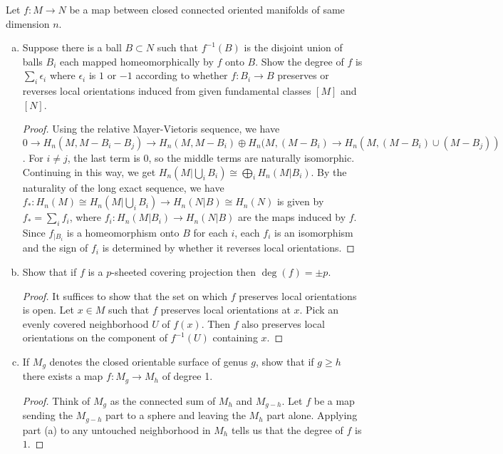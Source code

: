 \documentclass{article}
\begin{document}
 Let $f : M \to N$ be a map between closed connected oriented manifolds of same dimension $n$.
\begin{enumerate}[a.]
\item Suppose there is a ball $B \subset N$ such that $f^{-1}(B)$ is the disjoint union of balls $B_i$ each 
mapped homeomorphically by $f$ onto $B$. Show the degree of $f$ is $\sum_i \epsilon_i$ where $\epsilon_i$
is $1$ or $-1$ according to whether $f:B_i \to B$ preserves or reverses local orientations induced from
given fundamental classes $[M]$ and $[N]$.
\begin{proof} 
Using the relative Mayer-Vietoris sequence, we have 
$$0 \to H_n(M, M- B_i -B_j) \to H_n(M, M- B_i) \oplus H_n(M, (M- B_i) \to H_n(M, (M- B_i) \cup (M - B_j))$$.
For $i \neq j$, the last term is $0$, so the middle terms are naturally isomorphic. Continuing in this way, we get
$H_n(M | \bigcup_i B_i) \cong \bigoplus_i H_n(M | B_i)$. By the naturality of the long exact sequence,
 we have $f_*:H_n(M) \cong H_n(M | \bigcup_i B_i) \to H_n( N | B) \cong H_n(N)$ is given by
$f_* = \sum_i f_i$, where $f_i: H_n(M|B_i) \to H_n(N|B)$ are the maps induced by $f$.  Since $f_{|B_i}$ is
a homeomorphism onto $B$ for each $i$, each $f_i$ is an isomorphism and the sign of $f_i$ is determined 
by whether it reverses local orientations.  
\end{proof}
\item Show that if $f$ is a $p$-sheeted covering projection then $\deg(f) = \pm p$.
\begin{proof}
It suffices to show that the set on which $f$ preserves local orientations is open. Let $x \in M$
such that $f$ preserves local orientations at $x$. Pick an evenly covered neighborhood $U$ of $f(x)$.  
Then $f$ also preserves local orientations on the component of $f^{-1}(U)$ containing $x$.
\end{proof}

\item If $M_g$ denotes the closed orientable surface of genus $g$, show that if $g \ge h$ there exists 
a map $f: M_g \to M_h$ of degree 1.
\begin{proof}
Think of $M_g$ as the connected sum of $M_h$ and $M_{g-h}$. 
Let $f$ be a map sending the $M_{g-h}$ part to a sphere and leaving the $M_h$ part alone.
 Applying part (a) to any untouched neighborhood in $M_h$ tells us that the degree of $f$ is $1$.
\end{proof}


\end{enumerate}
\end{document}

